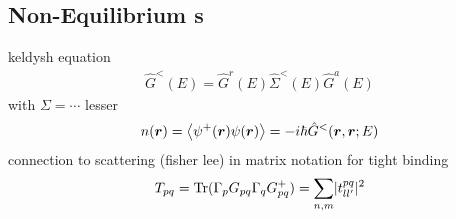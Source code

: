 \subsection{Non-Equilibrium \cgfnc s}
keldysh equation
\begin{align}
\hat{G}^<(E) = \hat{G}^r(E) \hat{\Sigma}^<(E) \hat{G}^a(E)
\label{eqn:keldyshequation}
\end{align}
with $\Sigma = \dotsb$
lesser \gfnc{}
\begin{align}
	n(\boldsymbol{r}) = \left< \psi^+ (\boldsymbol{r}) \psi(\boldsymbol{r})\right> = -i\hbar \hat{G}^<(\boldsymbol{r},\boldsymbol{r};E)
\end{align}
connection to scattering (fisher lee) in matrix notation for tight binding
\begin{align}
T_{pq} = \text{Tr}(\Gamma_p G_{pq} \Gamma_q G^+_{pq}) = \sum_{n,m} \lvert t^{pq}_{ll'}\rvert^2
\end{align}


